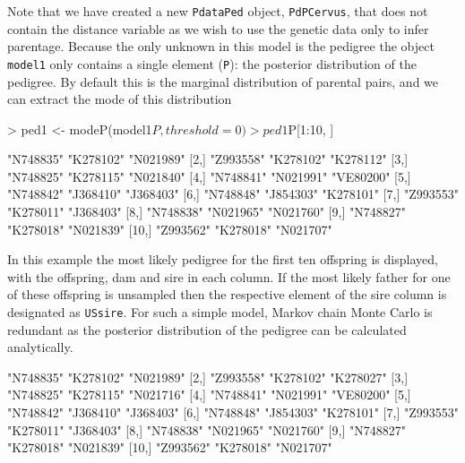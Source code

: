 \documentclass{article}
\begin{document}
Note that we have created a new \texttt{PdataPed} object, \texttt{PdPCervus}, that does not contain the distance variable as we wish to use the genetic data only to infer parentage.  Because the only unknown in this model is the pedigree the object \texttt{model1} only contains a single element (\texttt{P}): the posterior distribution of the pedigree.  By default this is the marginal distribution of parental pairs, and we can extract the mode of this distribution

\begin{Schunk}
\begin{Sinput}
> ped1 <- modeP(model1$P, threshold = 0)
> ped1$P[1:10, ]
\end{Sinput}
\begin{Soutput}
      [,1]      [,2]      [,3]     
 [1,] "N748835" "K278102" "N021989"
 [2,] "Z993558" "K278102" "K278112"
 [3,] "N748825" "K278115" "N021840"
 [4,] "N748841" "N021991" "VE80200"
 [5,] "N748842" "J368410" "J368403"
 [6,] "N748848" "J854303" "K278101"
 [7,] "Z993553" "K278011" "J368403"
 [8,] "N748838" "N021965" "N021760"
 [9,] "N748827" "K278018" "N021839"
[10,] "Z993562" "K278018" "N021707"
\end{Soutput}
\end{Schunk}

In this example the most likely pedigree for the first ten offspring is displayed, with the offspring, dam and sire in each column.  If the most likely father for one of these offspring is unsampled then the respective element of the sire column is designated as \texttt{USsire}. For such a simple model, Markov chain Monte Carlo is redundant as the posterior distribution of the pedigree can be calculated analytically. 

\begin{Schunk}
\begin{Soutput}
      [,1]      [,2]      [,3]     
 [1,] "N748835" "K278102" "N021989"
 [2,] "Z993558" "K278102" "K278027"
 [3,] "N748825" "K278115" "N021716"
 [4,] "N748841" "N021991" "VE80200"
 [5,] "N748842" "J368410" "J368403"
 [6,] "N748848" "J854303" "K278101"
 [7,] "Z993553" "K278011" "J368403"
 [8,] "N748838" "N021965" "N021760"
 [9,] "N748827" "K278018" "N021839"
[10,] "Z993562" "K278018" "N021707"
\end{Soutput}
\end{Schunk}
\end{document}
